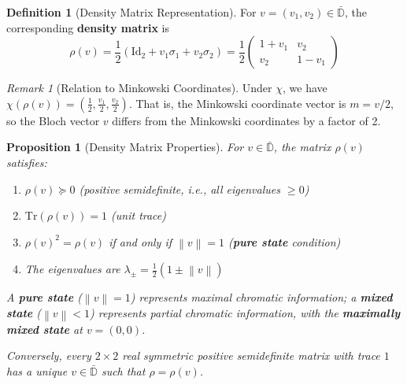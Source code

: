 \documentclass[11pt]{article}
\theoremstyle{plain}
\newtheorem{proposition}[theorem]{Proposition}
\theoremstyle{definition}
\newtheorem{definition}[theorem]{Definition}
\theoremstyle{remark}
\newtheorem{remark}[theorem]{Remark}
\newcommand{\D}{\mathbb{D}}
\newcommand{\norm}[1]{\left\lVert #1 \right\rVert}
\newcommand{\Tr}{\mathrm{Tr}}
\newcommand{\Id}{\mathrm{Id}}
\begin{document}
\begin{definition}[Density Matrix Representation]
\label{def:density-matrix}
For $v = (v_1, v_2) \in \bar{\D}$, the corresponding \textbf{density matrix} is
\begin{equation}
\boxed{
\rho(v) = \frac{1}{2}\left( \Id_2 + v_1 \sigma_1 + v_2 \sigma_2 \right) = \frac{1}{2} \begin{pmatrix} 1 + v_1 & v_2 \\ v_2 & 1 - v_1 \end{pmatrix}
}
\end{equation}
\end{definition}

\begin{remark}[Relation to Minkowski Coordinates]
Under $\chi$, we have $\chi(\rho(v)) = (\frac{1}{2}, \frac{v_1}{2}, \frac{v_2}{2})$. That is, the Minkowski coordinate vector is $m = v/2$, so the Bloch vector $v$ differs from the Minkowski coordinates by a factor of 2.
\end{remark}

\begin{proposition}[Density Matrix Properties]
\label{prop:density-props}
For $v \in \bar{\D}$, the matrix $\rho(v)$ satisfies:
\begin{enumerate}[label=(\roman*)]
    \item $\rho(v) \succeq 0$ (positive semidefinite, i.e., all eigenvalues $\geq 0$)
    \item $\Tr(\rho(v)) = 1$ (unit trace)
    \item $\rho(v)^2 = \rho(v)$ if and only if $\norm{v} = 1$ (\textbf{pure state} condition)
    \item The eigenvalues are $\lambda_{\pm} = \frac{1}{2}(1 \pm \norm{v})$
\end{enumerate}
A \textbf{pure state} ($\norm{v} = 1$) represents maximal chromatic information; a \textbf{mixed state} ($\norm{v} < 1$) represents partial chromatic information, with the \textbf{maximally mixed state} at $v = (0,0)$.

Conversely, every $2 \times 2$ real symmetric positive semidefinite matrix with trace $1$ has a unique $v \in \bar{\D}$ such that $\rho = \rho(v)$.
\end{proposition}
\end{document}
